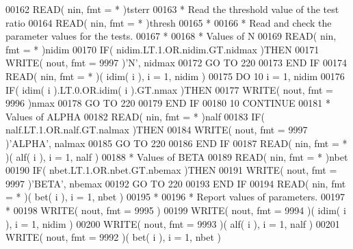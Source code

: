 \begin{DoxyCode}
00162       \textcolor{keyword}{READ}( nin, fmt = * )tsterr
00163 \textcolor{comment}{*     Read the threshold value of the test ratio}
00164       \textcolor{keyword}{READ}( nin, fmt = * )thresh
00165 \textcolor{comment}{*}
00166 \textcolor{comment}{*     Read and check the parameter values for the tests.}
00167 \textcolor{comment}{*}
00168 \textcolor{comment}{*     Values of N}
00169       \textcolor{keyword}{READ}( nin, fmt = * )nidim
00170       \textcolor{keywordflow}{IF}( nidim.LT.1.OR.nidim.GT.nidmax )\textcolor{keywordflow}{THEN}
00171          \textcolor{keyword}{WRITE}( nout, fmt = 9997 )\textcolor{stringliteral}{'N'}, nidmax
00172          \textcolor{keywordflow}{GO TO} 220
00173 \textcolor{keywordflow}{      END IF}
00174       \textcolor{keyword}{READ}( nin, fmt = * )( idim( i ), i = 1, nidim )
00175       \textcolor{keywordflow}{DO} 10 i = 1, nidim
00176          \textcolor{keywordflow}{IF}( idim( i ).LT.0.OR.idim( i ).GT.nmax )\textcolor{keywordflow}{THEN}
00177             \textcolor{keyword}{WRITE}( nout, fmt = 9996 )nmax
00178             \textcolor{keywordflow}{GO TO} 220
00179 \textcolor{keywordflow}{         END IF}
00180    10 \textcolor{keywordflow}{CONTINUE}
00181 \textcolor{comment}{*     Values of ALPHA}
00182       \textcolor{keyword}{READ}( nin, fmt = * )nalf
00183       \textcolor{keywordflow}{IF}( nalf.LT.1.OR.nalf.GT.nalmax )\textcolor{keywordflow}{THEN}
00184          \textcolor{keyword}{WRITE}( nout, fmt = 9997 )\textcolor{stringliteral}{'ALPHA'}, nalmax
00185          \textcolor{keywordflow}{GO TO} 220
00186 \textcolor{keywordflow}{      END IF}
00187       \textcolor{keyword}{READ}( nin, fmt = * )( alf( i ), i = 1, nalf )
00188 \textcolor{comment}{*     Values of BETA}
00189       \textcolor{keyword}{READ}( nin, fmt = * )nbet
00190       \textcolor{keywordflow}{IF}( nbet.LT.1.OR.nbet.GT.nbemax )\textcolor{keywordflow}{THEN}
00191          \textcolor{keyword}{WRITE}( nout, fmt = 9997 )\textcolor{stringliteral}{'BETA'}, nbemax
00192          \textcolor{keywordflow}{GO TO} 220
00193 \textcolor{keywordflow}{      END IF}
00194       \textcolor{keyword}{READ}( nin, fmt = * )( bet( i ), i = 1, nbet )
00195 \textcolor{comment}{*}
00196 \textcolor{comment}{*     Report values of parameters.}
00197 \textcolor{comment}{*}
00198       \textcolor{keyword}{WRITE}( nout, fmt = 9995 )
00199       \textcolor{keyword}{WRITE}( nout, fmt = 9994 )( idim( i ), i = 1, nidim )
00200       \textcolor{keyword}{WRITE}( nout, fmt = 9993 )( alf( i ), i = 1, nalf )
00201       \textcolor{keyword}{WRITE}( nout, fmt = 9992 )( bet( i ), i = 1, nbet )

\end{DoxyCode}
